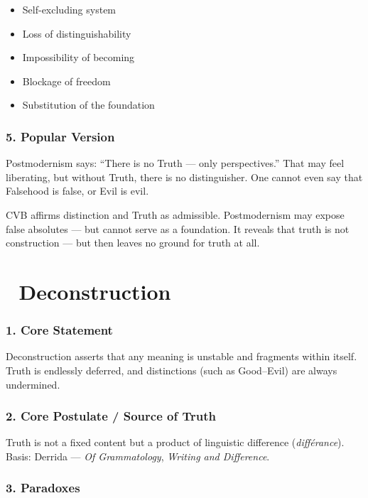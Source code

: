 \documentclass[12pt]{article}
\begin{document}
\begin{itemize}
\item Self-excluding system
\item Loss of distinguishability
\item Impossibility of becoming
\item Blockage of freedom
\item Substitution of the foundation
\end{itemize}

\subsubsection*{5. Popular Version}

Postmodernism says: ``There is no Truth — only perspectives.'' That may feel liberating, but without Truth, there is no distinguisher. One cannot even say that Falsehood is false, or Evil is evil.

CVB affirms distinction and Truth as admissible. Postmodernism may expose false absolutes — but cannot serve as a foundation. It reveals that truth is not construction — but then leaves no ground for truth at all.

\section*{🔷 Deconstruction}

\subsubsection*{1. Core Statement}

Deconstruction asserts that any meaning is unstable and fragments within itself. Truth is endlessly deferred, and distinctions (such as Good–Evil) are always undermined.

\subsubsection*{2. Core Postulate / Source of Truth}

Truth is not a fixed content but a product of linguistic difference (\textit{différance}). Basis: Derrida — \textit{Of Grammatology}, \textit{Writing and Difference}.

\subsubsection*{3. Paradoxes}
\end{document}
